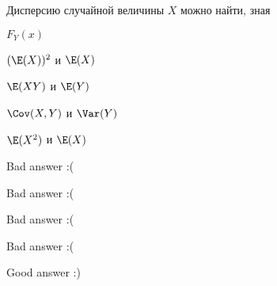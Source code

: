 
\begin{question}
Дисперсию случайной величины \(X\) можно найти, зная
\begin{answerlist}
  \item \(F_Y(x)\)
  \item \((\E(X))^2\) и \(\E(X)\)
  \item \(\E(XY)\) и \(\E(Y)\)
  \item \(\Cov(X,Y)\) и \(\Var(Y)\)
  \item \(\E(X^2)\) и \(\E(X)\)
\end{answerlist}
\end{question}

\begin{solution}
\begin{answerlist}
  \item Bad answer :(
  \item Bad answer :(
  \item Bad answer :(
  \item Bad answer :(
  \item Good answer :)
\end{answerlist}
\end{solution}

